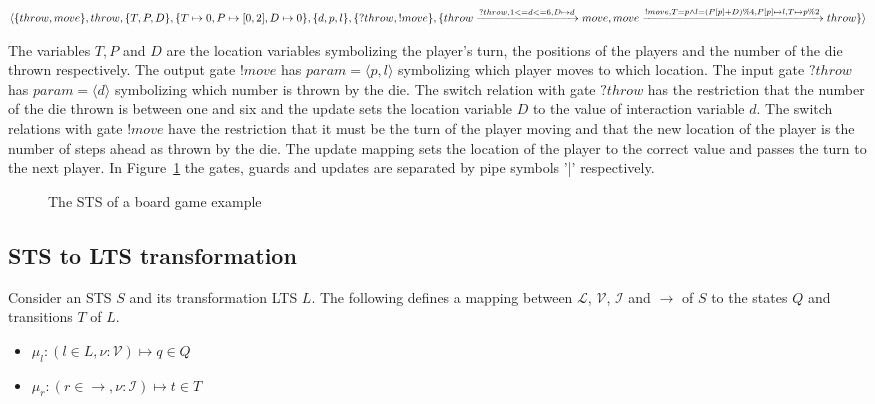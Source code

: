 $\langle\{throw, move\},throw,\{T, P, D\},\{T \mapsto 0, P \mapsto [0, 2], D \mapsto 0\},\{d, p, l\},\{?throw, !move\},\\
\{throw\xrightarrow{?throw, 1 <= d <= 6, D \mapsto d}move, move\xrightarrow{!move, T=p \land l=(P[p]+D)\%4, P[p] \mapsto l, T \mapsto p\%2}throw\}\rangle$

The variables $T, P$ and $D$ are the location variables symbolizing the player's turn, the positions of the players and the number of the die thrown respectively. The output gate $!move$ has $param = \langle p, l\rangle$ symbolizing which player moves to which location. The input gate $?throw$ has $param = \langle d\rangle$ symbolizing which number is thrown by the die. The switch relation with gate $?throw$ has the restriction that the number of the die thrown is between one and six and the update sets the location variable $D$ to the value of interaction variable $d$. The switch relations with gate $!move$ have the restriction that it must be the turn of the player moving and that the new location of the player is the number of steps ahead as thrown by the die. The update mapping sets the location of the player to the correct value and passes the turn to the next player. In Figure~\ref{fig:example_sts} the gates, guards and updates are separated by pipe symbols '|' respectively.

\begin{figure}[ht]
  \begin{center}
    
  \end{center}
  \caption{The STS of a board game example}
  \label{fig:example_sts}
\end{figure}

\subsection{STS to LTS transformation}\label{sec:sts_lts_trafo}
Consider an STS $S$ and its transformation LTS $L$. The following defines a mapping between $\mathcal{L}$, $\mathcal{V}$, $\mathcal{I}$ and $\rightarrow$ of $S$ to the states $Q$ and transitions $T$ of $L$.

\begin{itemize}
  \item $\mu_l:(l \in L, \nu:\mathcal{V}) \mapsto q \in Q$
  \item $\mu_r:(r \in \rightarrow, \nu:\mathcal{I}) \mapsto t \in T$
\end{itemize}

